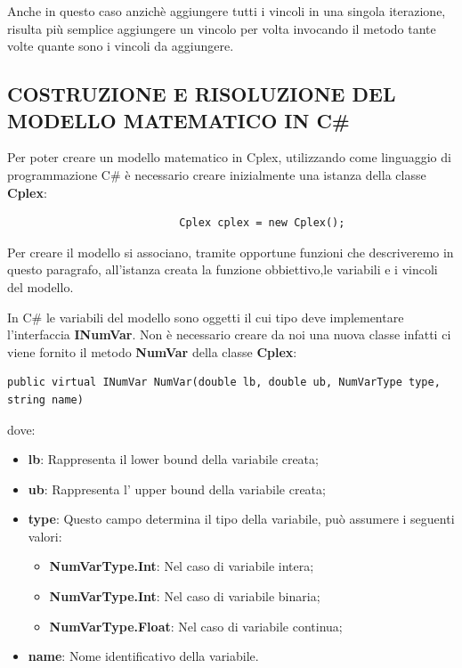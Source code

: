 \documentclass[11pt]{article}
\begin{document}
Anche in questo caso anzichè aggiungere tutti i vincoli in una singola iterazione, risulta più semplice aggiungere un vincolo per volta invocando il metodo tante volte quante sono i vincoli da aggiungere.

\subsection*{COSTRUZIONE E RISOLUZIONE DEL MODELLO MATEMATICO IN C\#}

Per poter creare un modello matematico in Cplex, utilizzando come linguaggio di programmazione C\# è necessario creare inizialmente una istanza della classe \textbf{Cplex}:

\begin{lstlisting}
                           Cplex cplex = new Cplex();
\end{lstlisting}

Per creare il modello si associano, tramite opportune funzioni che descriveremo in questo paragrafo, all'istanza creata la funzione obbiettivo,le variabili e i vincoli del modello. 

In C\# le variabili del modello sono oggetti il cui tipo deve implementare l'interfaccia \textbf{INumVar}. Non è necessario creare da noi una nuova classe infatti ci viene fornito il metodo \textbf{NumVar} della classe \textbf{Cplex}:

\begin{lstlisting}
public virtual INumVar NumVar(double lb, double ub, NumVarType type, string name)
\end{lstlisting}

dove:

\begin{itemize}
\item \textbf{lb}: Rappresenta il lower bound della variabile creata;
\item \textbf{ub}: Rappresenta l' upper bound della variabile creata;
\item \textbf{type}: Questo campo determina il tipo della variabile, può assumere i seguenti valori:
\begin{itemize}
\item \textbf{NumVarType.Int}: Nel caso di variabile intera;
\item \textbf{NumVarType.Int}: Nel caso di variabile binaria;
\item \textbf{NumVarType.Float}: Nel caso di variabile continua;
\end{itemize}
\item \textbf{name}: Nome identificativo della variabile.
\end{itemize}
\end{document}
